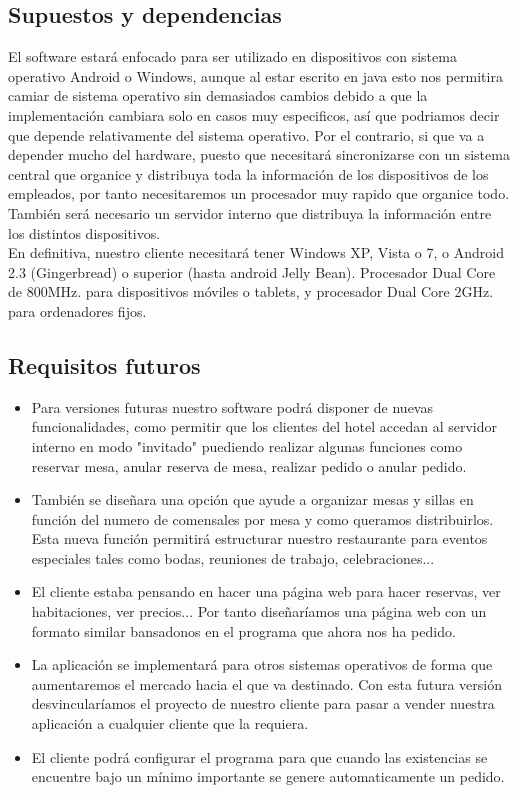 \documentclass[spanish,a4paper,12pt]{report}		%
\begin{document}
\subsection{Supuestos y dependencias}	
	El software estará enfocado para ser utilizado en dispositivos con sistema operativo Android o Windows, aunque al estar escrito en java esto nos permitira camiar de sistema operativo sin demasiados cambios debido a que la implementación cambiara solo en casos muy especificos, así que podriamos decir que depende relativamente del sistema operativo.  Por el contrario, si que va a depender mucho del hardware, puesto que necesitará sincronizarse con un sistema central que organice y distribuya toda la información de los dispositivos de los empleados, por tanto necesitaremos un procesador muy rapido que organice todo. También será necesario un servidor interno que distribuya la información entre los distintos dispositivos.	\\

En definitiva,  nuestro cliente necesitará tener Windows XP, Vista o 7, o Android 2.3 (Gingerbread) o superior (hasta android Jelly Bean).
Procesador Dual Core de 800MHz. para dispositivos móviles o tablets, y procesador Dual Core 2GHz. para ordenadores fijos.

\subsection{Requisitos futuros}
	\begin{itemize}
		\item Para versiones futuras nuestro software podrá disponer de nuevas funcionalidades, como permitir que los clientes del hotel accedan al servidor interno en modo "invitado" puediendo realizar algunas funciones como reservar mesa, anular reserva de mesa, realizar pedido o anular pedido.

		\item También se diseñara una opción que ayude a organizar mesas y sillas en función del numero de comensales por mesa y como queramos distribuirlos. Esta nueva función permitirá estructurar nuestro restaurante para eventos especiales tales como bodas, reuniones de trabajo, celebraciones...

		\item El cliente estaba pensando en hacer una página web para hacer reservas, ver habitaciones, ver precios... Por tanto diseñaríamos una página web con un formato similar bansadonos en el programa que ahora nos ha pedido.

		\item La aplicación se implementará para otros sistemas operativos de forma que aumentaremos el mercado hacia el que va destinado. Con esta futura versión desvincularíamos el proyecto de nuestro cliente para pasar a vender nuestra aplicación a cualquier cliente que la requiera.
		
		\item El cliente podrá configurar el programa para que cuando las existencias se encuentre bajo un mínimo importante se genere automaticamente un pedido.
	\end{itemize}
\end{document}
